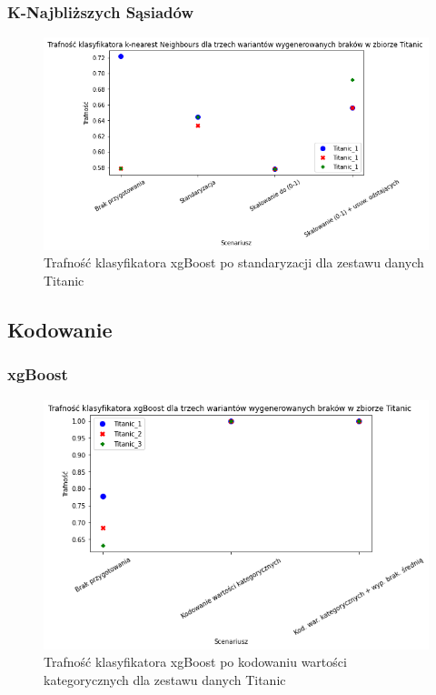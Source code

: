 \documentclass{book}
\begin{document}
\subsubsection{K-Najbliższych Sąsiadów}
\begin{figure}[H]
    \centerline{\includegraphics[scale=0.5]{Titanic_knn_Standaryzacja}}
    \centering
    \caption{Trafność klasyfikatora xgBoost po standaryzacji dla zestawu danych Titanic}
    \end{figure}

\subsection{Kodowanie}

\subsubsection{xgBoost} 
\begin{figure}[H]
    \centerline{\includegraphics[scale=0.5]{Titanic_xgb_Kodowanie}}
    \centering
    \caption{Trafność klasyfikatora xgBoost po kodowaniu wartości kategorycznych dla zestawu danych Titanic}
    \end{figure}
\end{document}
